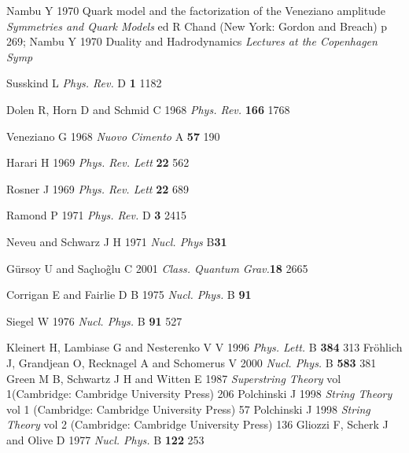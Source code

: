 \documentclass[a4paper,a4paper]{article}
\begin{document}
\begin{thebibliography}{25}

 Nambu Y 1970 Quark model and the factorization of the
Veneziano amplitude {\it{Symmetries and Quark Models}} ed R Chand (New
York:
Gordon and Breach) p 269; Nambu Y 1970 Duality and Hadrodynamics
{\it{Lectures at the Copenhagen Symp}}

 Susskind L {\it {Phys. Rev.}} D {\bf {1}} 1182

 Dolen R, Horn D and Schmid C 1968  {\it{Phys. Rev.}}
{\bf{166}} 1768

 Veneziano G 1968 {\it{Nuovo Cimento}} A {\bf{57}} 190

 Harari H 1969  {\it{Phys. Rev. Lett}} {\bf{22}} 562

 Rosner J 1969  {\it{Phys. Rev. Lett}} {\bf{22}} 689

 Ramond P 1971  {\it{Phys. Rev.}} D {\bf{3}} 2415

 Neveu and Schwarz J H 1971 {\it{Nucl. Phys}} B{\bf{31}}

 G\"{u}rsoy U and Sa\c{c}l{\i}o\~{g}lu C 2001 {\it{Class.
Quantum Grav.}}{\bf{18}} 2665

 Corrigan E and Fairlie D B 1975 {\it{Nucl. Phys.}} B
{\bf{91}}

 Siegel W 1976 {\it{Nucl. Phys.}} B {\bf{91}} 527

 Kleinert H, Lambiase G and Nesterenko V V 1996 {\it{Phys.
Lett.}} B {\bf{384}} 313
 Fr\"{o}hlich J, Grandjean O, Recknagel A and Schomerus V
2000 {\it{Nucl. Phys.}} B {\bf{583}} 381
 Green M B, Schwartz J H and Witten E 1987 {\it{Superstring
Theory}} vol 1(Cambridge: Cambridge University Press) 206
  Polchinski J 1998 {\it{String Theory}} vol 1 (Cambridge:
Cambridge University Press) 57
 Polchinski J 1998 {\it{String Theory}} vol 2 (Cambridge:
Cambridge University Press) 136
 Gliozzi F, Scherk J and Olive D 1977 {\it{Nucl. Phys.}} B
{\bf{122}} 253

\end{thebibliography}
\end{document}
